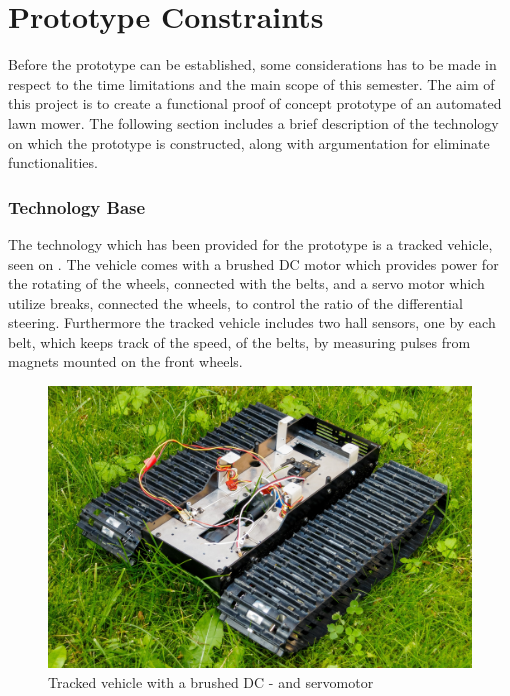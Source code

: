 \section{Prototype Constraints}
Before the prototype can be established, some considerations has to be made in respect to the time limitations and the main scope of this semester. The aim of this project is to create a functional proof of concept prototype of an automated lawn mower. The following section includes a brief description of the technology on which the prototype is constructed, along with argumentation for eliminate functionalities.

\subsubsection{Technology Base}
The technology which has been provided for the prototype is a tracked vehicle, seen on . The vehicle comes with a brushed DC motor which provides power for the rotating of the wheels, connected with the belts, and a servo motor which utilize breaks, connected the wheels, to control the ratio of the differential steering. Furthermore the tracked vehicle includes two hall sensors, one by each belt, which keeps track of the speed, of the belts, by measuring pulses from magnets mounted on the front wheels.

\begin{figure}[H]
	\centering
	\includegraphics[scale=0.1]{figures/BeltVehicle.jpg}
	\flushleft
	\caption{Tracked vehicle with a brushed DC - and servomotor}
	\label{TrackedVehicle}
\end{figure}


